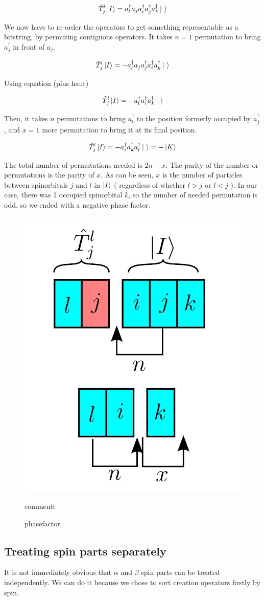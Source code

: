 $$\hat T_j^l \ket I = a^\dagger_l a_j a^\dagger_i a^\dagger_j a^\dagger_k \ket \ $$

We now have to re-order the operators to get something representable as a bitstring, by permuting contiguous operators. It takes $n=1$ permutation to bring $a^\dagger_j$ in front of $a_j$.


$$\hat T_j^l \ket I = -a^\dagger_l a_j a^\dagger_j a^\dagger_i a^\dagger_k \ket \ $$

Using equation (plus haut)

$$\hat T_j^l \ket I = -a^\dagger_l a^\dagger_i a^\dagger_k \ket \ $$

Then, it takes $n$ permutations to bring $a^\dagger_l$ to the position formerly occupied by $a^\dagger_j$, and $x=1$ more permutation to bring it at its final position.

$$\hat T_j^l \ket I = -a^\dagger_i a^\dagger_k a^\dagger_l \ket \  = -\ket K$$

The total number of permutations needed is $2n+x$. The parity of the number or permutations is the parity of $x$. As can be seen, $x$ is the number of particles between spinorbitals $j$ and $l$ in $\ket I$ ( regardless of whether $l>j$ or $l<j$ ). In our case, there was 1 occupied spinorbital $k$, so the number of needed permutation is odd, so we ended with a negative phase factor.

\begin{figure}[h!]
	\begin{center}
		\includegraphics[width=0.3\columnwidth]{figures/determinant_driven/phasefactor}
		\caption{
		\label{phasefactor}%
		phasefactor
		}
		commentt
	\end{center}
\end{figure}

\subsection{Treating spin parts separately}

It is not immediately obvious that $\alpha$ and $\beta$ spin parts can be treated independently. We can do it because we chose to sort creation operators firstly by spin.

